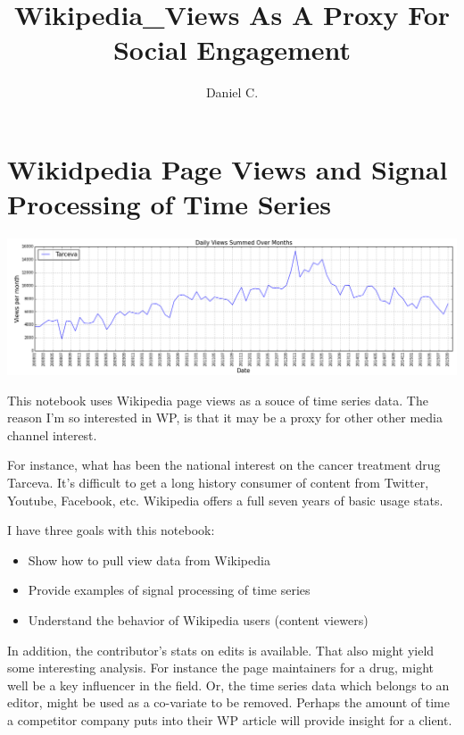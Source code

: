 \documentclass{article}
\title{Wikipedia\_Views As A Proxy For Social Engagement}
\author{Daniel C.}
\begin{document}
    \maketitle




    \section{Wikidpedia Page Views and Signal Processing of Time
Series}\label{wikidpedia-page-views-and-signal-processing-of-time-series}

\includegraphics[scale=0.3]{tarceva_plot.png}

This notebook uses Wikipedia page views as a souce of time series data.
The reason I'm so interested in WP, is that it may be a proxy for other
other media channel interest.

For instance, what has been the national interest on the cancer
treatment drug Tarceva. It's difficult to get a long history consumer of
content from Twitter, Youtube, Facebook, etc. Wikipedia offers a full
seven years of basic usage stats.

I have three goals with this notebook:

\begin{itemize}
\itemsep1pt\parskip0pt
\item
  Show how to pull view data from Wikipedia
\item
  Provide examples of signal processing of time series
\item
  Understand the behavior of Wikipedia users (content viewers)
\end{itemize}

In addition, the contributor's stats on edits is available. That also
might yield some interesting analysis. For instance the page maintainers
for a drug, might well be a key influencer in the field. Or, the time
series data which belongs to an editor, might be used as a co-variate to
be removed. Perhaps the amount of time a competitor company puts into
their WP article will provide insight for a client.
\end{document}
